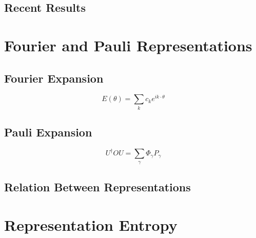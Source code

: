 \documentclass[11pt]{article}
\begin{document}

\subsection{Recent Results}


\section{Fourier and Pauli Representations}

\subsection{Fourier Expansion}

\begin{equation}
E(\theta) = \sum_{k} c_k e^{i k \cdot \theta}
\end{equation}


\subsection{Pauli Expansion}

\begin{equation}
U^\dagger O U = \sum_{\gamma} \Phi_\gamma P_\gamma
\end{equation}


\subsection{Relation Between Representations}


\section{Representation Entropy}
\end{document}

